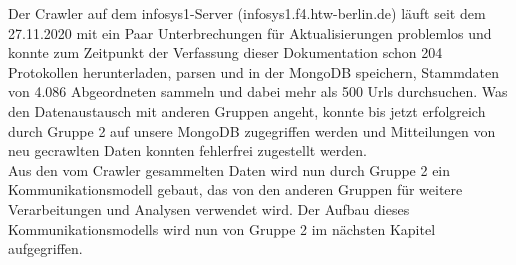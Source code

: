 Der Crawler auf dem infosys1-Server (infosys1.f4.htw-berlin.de) läuft seit dem 27.11.2020 mit ein Paar Unterbrechungen für Aktualisierungen problemlos und konnte zum Zeitpunkt der Verfassung dieser Dokumentation schon 204 Protokollen herunterladen, parsen und in der MongoDB speichern, Stammdaten von 4.086 Abgeordneten sammeln und dabei mehr als 500 Urls durchsuchen. Was den Datenaustausch mit anderen Gruppen angeht, konnte bis jetzt erfolgreich durch Gruppe 2 auf unsere MongoDB zugegriffen werden und Mitteilungen von neu gecrawlten Daten konnten fehlerfrei zugestellt werden.\\
Aus den vom Crawler gesammelten Daten wird nun durch Gruppe 2 ein Kommunikationsmodell gebaut, das von den anderen Gruppen für weitere Verarbeitungen und Analysen verwendet wird. Der Aufbau dieses Kommunikationsmodells wird nun von Gruppe 2 im nächsten Kapitel aufgegriffen. 